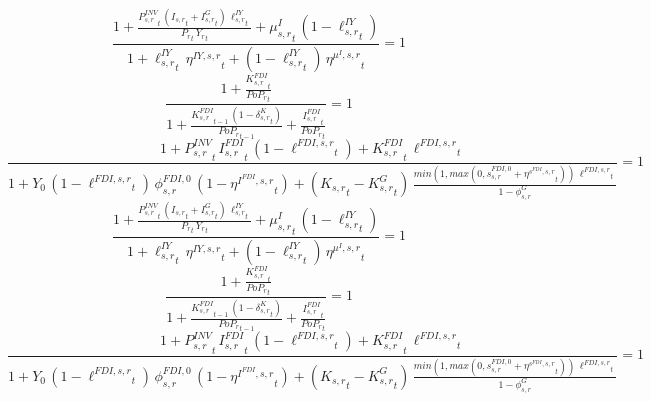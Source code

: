 \noindent[name= `Investment-to-GDP wedge 2 1']
\begin{dmath}
\frac{1+\frac{{{P^{INV}_{s,r}}}_{t}\, \left({{I_{s,r}}}_{t}+{{I^G_{s,r}}}_{t}\right)\, {{\ell^{IY}_{s,r}}}_{t}}{{{P_{r}}}_{t}\, {{Y_r}}_{t}}+{{\mu^{I}_{s,r}}}_{t}\, \left(1-{{\ell^{IY}_{s,r}}}_{t}\right)}{1+{{\ell^{IY}_{s,r}}}_{t}\, {{\eta^{IY,s,r}}}_{t}+\left(1-{{\ell^{IY}_{s,r}}}_{t}\right)\, {{\eta^{\mu^{I},s,r}}}_{t}}=1
\end{dmath}
\noindent[name= `K\_FDI LOM 2 1']
\begin{dmath}
\frac{1+\frac{{{K^{FDI}_{s,r}}}_{t}}{{{PoP_r}}_{t}}}{1+\frac{{{K^{FDI}_{s,r}}}_{t-1}\, \left(1-{{\delta^{K}_{s,r}}}_{t}\right)}{{{PoP_r}}_{t-1}}+\frac{{{I^{FDI}_{s,r}}}_{t}}{{{PoP_r}}_{t}}}=1
\end{dmath}
\noindent[name= `I-FDI target 2 1']
\begin{dmath}
\frac{1+{{P^{INV}_{s,r}}}_{t}\, {{I^{FDI}_{s,r}}}_{t}\, \left(1-{{\ell^{FDI,s,r}}}_{t}\right)+{{K^{FDI}_{s,r}}}_{t}\, {{\ell^{FDI,s,r}}}_{t}}{1+{{Y_0}}\, \left(1-{{\ell^{FDI,s,r}}}_{t}\right)\, {{\phi^{FDI,0}_{s,r}}}\, \left(1-{{\eta^{I^{FDI},s,r}}}_{t}\right)+\left({{K_{s,r}}}_{t}-{{K^G_{s,r}}}_{t}\right)\, \frac{min(1,max(0,{{s^{FDI,0}_{s,r}}}+{{\eta^{s^{FDI},s,r}}}_{t}))\, {{\ell^{FDI,s,r}}}_{t}}{1-{{\phi^{G}_{s,r}}}}}=1
\end{dmath}
\noindent[name= `Investment-to-GDP wedge 3 1']
\begin{dmath}
\frac{1+\frac{{{P^{INV}_{s,r}}}_{t}\, \left({{I_{s,r}}}_{t}+{{I^G_{s,r}}}_{t}\right)\, {{\ell^{IY}_{s,r}}}_{t}}{{{P_{r}}}_{t}\, {{Y_r}}_{t}}+{{\mu^{I}_{s,r}}}_{t}\, \left(1-{{\ell^{IY}_{s,r}}}_{t}\right)}{1+{{\ell^{IY}_{s,r}}}_{t}\, {{\eta^{IY,s,r}}}_{t}+\left(1-{{\ell^{IY}_{s,r}}}_{t}\right)\, {{\eta^{\mu^{I},s,r}}}_{t}}=1
\end{dmath}
\noindent[name= `K\_FDI LOM 3 1']
\begin{dmath}
\frac{1+\frac{{{K^{FDI}_{s,r}}}_{t}}{{{PoP_r}}_{t}}}{1+\frac{{{K^{FDI}_{s,r}}}_{t-1}\, \left(1-{{\delta^{K}_{s,r}}}_{t}\right)}{{{PoP_r}}_{t-1}}+\frac{{{I^{FDI}_{s,r}}}_{t}}{{{PoP_r}}_{t}}}=1
\end{dmath}
\noindent[name= `I-FDI target 3 1']
\begin{dmath}
\frac{1+{{P^{INV}_{s,r}}}_{t}\, {{I^{FDI}_{s,r}}}_{t}\, \left(1-{{\ell^{FDI,s,r}}}_{t}\right)+{{K^{FDI}_{s,r}}}_{t}\, {{\ell^{FDI,s,r}}}_{t}}{1+{{Y_0}}\, \left(1-{{\ell^{FDI,s,r}}}_{t}\right)\, {{\phi^{FDI,0}_{s,r}}}\, \left(1-{{\eta^{I^{FDI},s,r}}}_{t}\right)+\left({{K_{s,r}}}_{t}-{{K^G_{s,r}}}_{t}\right)\, \frac{min(1,max(0,{{s^{FDI,0}_{s,r}}}+{{\eta^{s^{FDI},s,r}}}_{t}))\, {{\ell^{FDI,s,r}}}_{t}}{1-{{\phi^{G}_{s,r}}}}}=1
\end{dmath}
